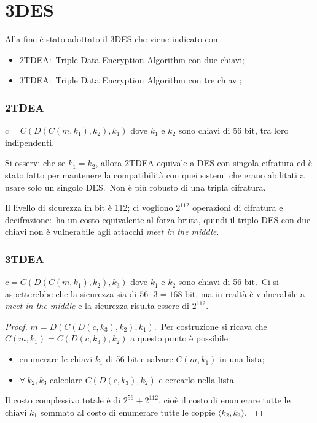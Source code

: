 \section{3DES}

Alla fine è stato adottato il 3DES che viene indicato con
\begin{itemize}
    \item 2TDEA:\ Triple Data Encryption Algorithm con due chiavi;
    \item 3TDEA:\ Triple Data Encryption Algorithm con tre chiavi;
\end{itemize}

\subsubsection{2TDEA}

$c = C(D(C(m,k_1), k_2), k_1)$ dove $k_1$ e $k_2$ sono chiavi di 56 bit, tra loro indipendenti.\

Si osservi che se $k_1=k_2$, allora 2TDEA equivale a DES con singola cifratura ed è stato fatto per mantenere la compatibilità con quei sistemi che erano abilitati a usare solo un singolo DES.\
Non è più robusto di una tripla cifratura.\

Il livello di sicurezza in bit è 112; ci vogliono $2^{112}$ operazioni di cifratura e decifrazione:\ ha un costo equivalente al forza bruta, quindi il triplo DES con due chiavi non è vulnerabile agli attacchi \textit{meet in the middle}.\

\subsubsection{3TDEA}

$c = C(D(C(m,k_1), k_2), k_3)$ dove $k_1$ e $k_2$ sono chiavi di 56 bit.\
Ci si aspetterebbe che la sicurezza sia di $56\cdot3=168$ bit, ma in realtà è vulnerabile a \textit{meet in the middle} e la sicurezza risulta essere di $2^{112}$.\

\begin{proof}
    $m = D(C(D(c,k_3),k_2),k_1)$.\
    Per costruzione si ricava che $C(m,k_1)=C(D(c,k_3),k_2)$ a questo punto è possibile:

    \begin{itemize}
        \item enumerare le chiavi $k_1$ di 56 bit e salvare $C(m,k_1)$ in una lista;
        \item $\forall\ k_2,k_3$ calcolare $C(D(c,k_3),k_2)$ e cercarlo nella lista.\
    \end{itemize}

    \noindent Il costo complessivo totale è di $2^{56} + 2^{112}$, cioè il costo di enumerare tutte le chiavi $k_1$ sommato al costo di enumerare tutte le coppie $\langle k_2,k_3\rangle$.\
\end{proof}


